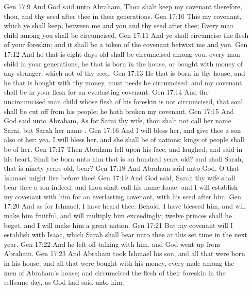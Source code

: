 \vs Gen 17:9 And God said unto Abraham, Thou shalt keep my covenant therefore, thou, and thy seed after thee in their generations.
\vs Gen 17:10 This  my covenant, which ye shall keep, between me and you and thy seed after thee; Every man child among you shall be circumcised.
\vs Gen 17:11 And ye shall circumcise the flesh of your foreskin; and it shall be a token of the covenant betwixt me and you.
\vs Gen 17:12 And he that is eight days old shall be circumcised among you, every man child in your generations, he that is born in the house, or bought with money of any stranger, which  not of thy seed.
\vs Gen 17:13 He that is born in thy house, and he that is bought with thy money, must needs be circumcised: and my covenant shall be in your flesh for an everlasting covenant.
\vs Gen 17:14 And the uncircumcised man child whose flesh of his foreskin is not circumcised, that soul shall be cut off from his people; he hath broken my covenant.
\vs Gen 17:15 And God said unto Abraham, As for Sarai thy wife, thou shalt not call her name Sarai, but Sarah  her name .
\vs Gen 17:16 And I will bless her, and give thee a son also of her: yea, I will bless her, and she shall be  of nations; kings of people shall be of her.
\vs Gen 17:17 Then Abraham fell upon his face, and laughed, and said in his heart, Shall  be born unto him that is an hundred years old? and shall Sarah, that is ninety years old, bear?
\vs Gen 17:18 And Abraham said unto God, O that Ishmael might live before thee!
\vs Gen 17:19 And God said, Sarah thy wife shall bear thee a son indeed; and thou shalt call his name Isaac: and I will establish my covenant with him for an everlasting covenant,  with his seed after him.
\vs Gen 17:20 And as for Ishmael, I have heard thee: Behold, I have blessed him, and will make him fruitful, and will multiply him exceedingly; twelve princes shall he beget, and I will make him a great nation.
\vs Gen 17:21 But my covenant will I establish with Isaac, which Sarah shall bear unto thee at this set time in the next year.
\vs Gen 17:22 And he left off talking with him, and God went up from Abraham.
\vs Gen 17:23 And Abraham took Ishmael his son, and all that were born in his house, and all that were bought with his money, every male among the men of Abraham's house; and circumcised the flesh of their foreskin in the selfsame day, as God had said unto him.
